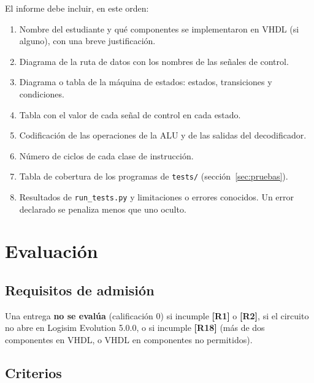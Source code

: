 \documentclass[11pt,a4paper]{article}
\newcommand{\sig}[1]{\texttt{#1}}
\newcommand{\req}[1]{\textbf{[#1]}}
\begin{document}
\noindent El informe debe incluir, en este orden:
\begin{enumerate}
\item Nombre del estudiante y qué componentes se implementaron en VHDL (si alguno), con una breve justificación.
\item Diagrama de la ruta de datos con los nombres de las señales de control.
\item Diagrama o tabla de la máquina de estados: estados, transiciones y condiciones.
\item Tabla con el valor de cada señal de control en cada estado.
\item Codificación de las operaciones de la ALU y de las salidas del decodificador.
\item Número de ciclos de cada clase de instrucción.
\item Tabla de cobertura de los programas de \sig{tests/} (sección~\ref{sec:pruebas}).
\item Resultados de \sig{run\_tests.py} y limitaciones o errores conocidos. Un error declarado se penaliza menos que uno oculto.
\end{enumerate}

\section{Evaluación}

\subsection{Requisitos de admisión}

Una entrega \textbf{no se evalúa} (calificación 0) si incumple \req{R1} o \req{R2}, si el circuito no abre en Logisim Evolution 5.0.0, o si incumple \req{R18} (más de dos componentes en VHDL, o VHDL en componentes no permitidos).

\subsection{Criterios}
\end{document}
